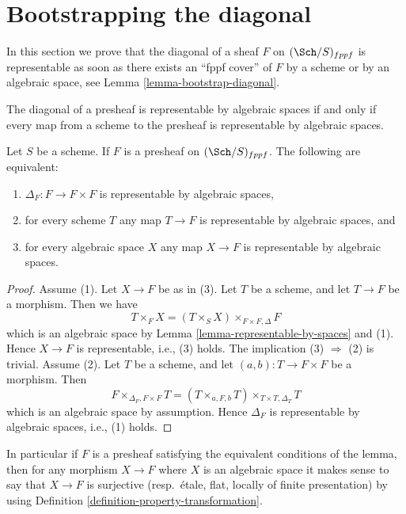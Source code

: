 \section{Bootstrapping the diagonal}
\label{section-bootstrap-diagonal}

\noindent
In this section we prove that the diagonal of a sheaf $F$ on
$(\Sch/S)_{fppf}$ is representable as soon as there exists
an ``fppf cover'' of $F$ by a scheme or by an algebraic space, see
Lemma \ref{lemma-bootstrap-diagonal}.

\begin{lemma}
\label{lemma-representable-diagonal}
\begin{slogan}
The diagonal of a presheaf is representable by algebraic spaces if and only if
every map from a scheme to the presheaf is representable by algebraic spaces.
\end{slogan}
Let $S$ be a scheme.
If $F$ is a presheaf on $(\Sch/S)_{fppf}$.
The following are equivalent:
\begin{enumerate}
\item $\Delta_F : F \to F \times F$ is representable by algebraic spaces,
\item for every scheme $T$ any map $T \to F$ is representable by algebraic
spaces, and
\item for every algebraic space $X$ any map $X \to F$ is representable
by algebraic spaces.
\end{enumerate}
\end{lemma}

\begin{proof}
Assume (1). Let $X \to F$ be as in (3). Let $T$ be a scheme, and let
$T \to F$ be a morphism. Then we have
$$
T \times_F X = (T \times_S X) \times_{F \times F, \Delta} F
$$
which is an algebraic space by
Lemma \ref{lemma-representable-by-spaces}
and (1). Hence $X \to F$ is representable, i.e., (3) holds.
The implication (3) $\Rightarrow$ (2) is trivial. Assume (2).
Let $T$ be a scheme, and let $(a, b) : T \to F \times F$ be a morphism.
Then
$$
F \times_{\Delta_F, F \times F} T =
(T \times_{a, F, b} T) \times_{T \times T, \Delta_T} T
$$
which is an algebraic space by assumption. Hence $\Delta_F$ is
representable by algebraic spaces, i.e., (1) holds.
\end{proof}

\noindent
In particular if $F$ is a presheaf satisfying the equivalent conditions of
the lemma, then for any morphism $X \to F$ where $X$ is an algebraic space
it makes sense to say that $X \to F$ is surjective (resp.\ \'etale, flat,
locally of finite presentation) by using
Definition \ref{definition-property-transformation}.

